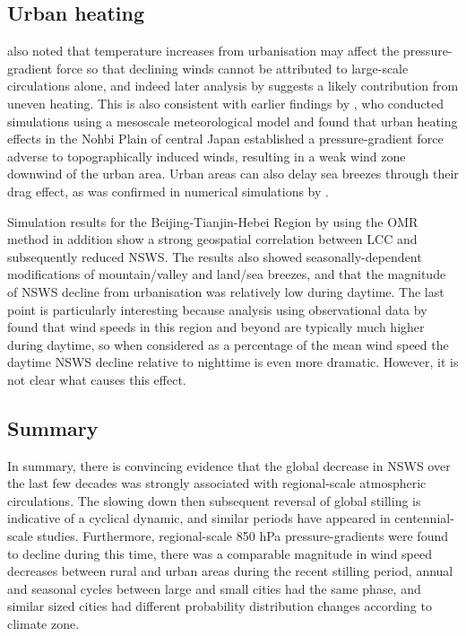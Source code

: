 \subsection{Urban heating}

\citet{guo2011} also noted that temperature increases from urbanisation may affect the pressure-gradient force so that declining winds cannot be attributed to large-scale circulations alone, and indeed later analysis by \citet{zhang2021} suggests a likely contribution from uneven heating. This is also consistent with earlier findings by \citet{kitada1998}, who conducted simulations using a mesoscale meteorological model and found that urban heating effects in the Nohbi Plain of central Japan established a pressure-gradient force adverse to topographically induced winds, resulting in a weak wind zone downwind of the urban area. Urban areas can also delay sea breezes through their drag effect, as was confirmed in numerical simulations by \citet{rajeswari2022}.

Simulation results for the Beijing-Tianjin-Hebei Region by \citet{wang2020} using the \ac{OMR} method in addition show a strong geospatial correlation between \ac{LCC} and subsequently reduced \ac{NSWS}. The results also showed seasonally-dependent modifications of mountain/valley and land/sea breezes, and that the magnitude of \ac{NSWS} decline from urbanisation was relatively low during daytime. The last point is particularly interesting because analysis using observational data by \citet{yu2009} found that wind speeds in this region and beyond are typically much higher during daytime, so when considered as a percentage of the mean wind speed the daytime \ac{NSWS} decline relative to nighttime is even more dramatic. However, it is not clear what causes this effect.

\subsection{Summary}

In summary, there is convincing evidence that the global decrease in \ac{NSWS} over the last few decades was strongly associated with regional-scale atmospheric circulations. The slowing down then subsequent reversal of global stilling is indicative of a cyclical dynamic, and similar periods have appeared in centennial-scale studies. Furthermore, regional-scale 850 hPa pressure-gradients were found to decline during this time, there was a comparable magnitude in wind speed decreases between rural and urban areas during the recent stilling period, annual and seasonal cycles between large and small cities had the same phase, and similar sized cities had different probability distribution changes according to climate zone.

